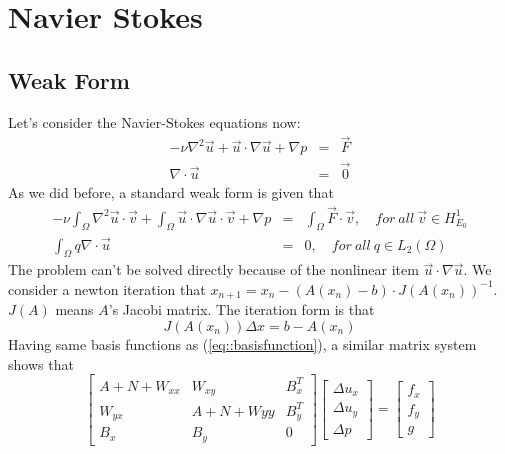 \documentclass[a4paper]{article}
\begin{document}
\section{Navier Stokes}
\subsection{Weak Form}
Let's consider the Navier-Stokes equations now:
\begin{equation}
\begin{array}{rcl}
-\nu \nabla^2 \vec{u} + \vec{u}\cdot \nabla \vec{u} + \nabla p &=& \vec{F} \\
\nabla \cdot \vec{u} &=& \vec{0}
\label{eq::Navier-Stokes-problem}
\end{array}
\end{equation}
As we did before, a standard weak form is given that
\begin{equation}
\begin{array}{rcl}
-\nu\int_\Omega \nabla^2 \vec{u} \cdot \vec{v}+\int_{\Omega}\vec{u}\cdot\nabla\vec{u}\cdot\vec{v} + \nabla p &=& \int_{\Omega}\vec{F}\cdot \vec{v},\quad for \ all \ \vec{v} \in H^1_{E_0} \\
\int_\Omega q\nabla \cdot \vec{u} &=&0,\quad for \ all \ q \in L_2(\Omega)
\label{eq::Navier-Stokes-weakform}
\end{array}
\end{equation}
The problem can't be solved directly because of the nonlinear item $\vec{u}\cdot \nabla \vec{u}$. We consider a newton iteration that $x_{n+1}=x_{n} - (A(x_n)-b)\cdot J(A(x_{n}))^{-1}$. $J(A)$ means $A$'s Jacobi matrix. The iteration form is that
$$ J(A(x_n))\Delta x = b - A(x_n)$$
\indent Having same basis functions as (\ref{eq::basisfunction}), a similar matrix system shows that
\begin{equation}
\left[ \begin{array}{ccc}
A + N +W_{xx} & W_{xy} & B_x^T \\
W_{yx} & A +N +W{yy}& B_y^T \\
B_x & B_y & 0
\end{array}
\right]
\left[\begin{array}{ccc}
\Delta u_x\\
\Delta u_y\\
\Delta p
\end{array}
\right]=
\left[\begin{array}{ccc}
f_x\\
f_y\\
g
\end{array}
\right]
\label{Navier-Stokes}
\end{equation}
\end{document}

